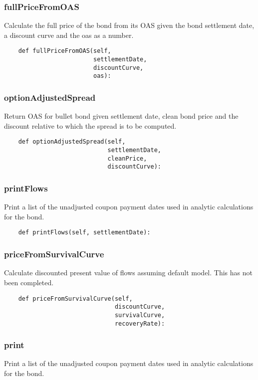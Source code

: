 \documentclass[twoside,11pt]{book}
\begin{document}
\subsubsection*{{\bf fullPriceFromOAS}}
Calculate the full price of the bond from its OAS given the bond settlement date, a discount curve and the oas as a number.  

\begin{lstlisting}
    def fullPriceFromOAS(self,
                         settlementDate,
                         discountCurve,
                         oas):
\end{lstlisting}

\subsubsection*{{\bf optionAdjustedSpread}}
Return OAS for bullet bond given settlement date, clean bond price and the discount relative to which the spread is to be computed.  

\begin{lstlisting}
    def optionAdjustedSpread(self,
                             settlementDate,
                             cleanPrice,
                             discountCurve):
\end{lstlisting}

\subsubsection*{{\bf printFlows}}
Print a list of the unadjusted coupon payment dates used in analytic calculations for the bond.  

\begin{lstlisting}
    def printFlows(self, settlementDate):
\end{lstlisting}

\subsubsection*{{\bf priceFromSurvivalCurve}}
Calculate discounted present value of flows assuming default model. This has not been completed.  

\begin{lstlisting}
    def priceFromSurvivalCurve(self,
                               discountCurve,
                               survivalCurve,
                               recoveryRate):
\end{lstlisting}

\subsubsection*{{\bf print}}
Print a list of the unadjusted coupon payment dates used in analytic calculations for the bond.  
\end{document}
